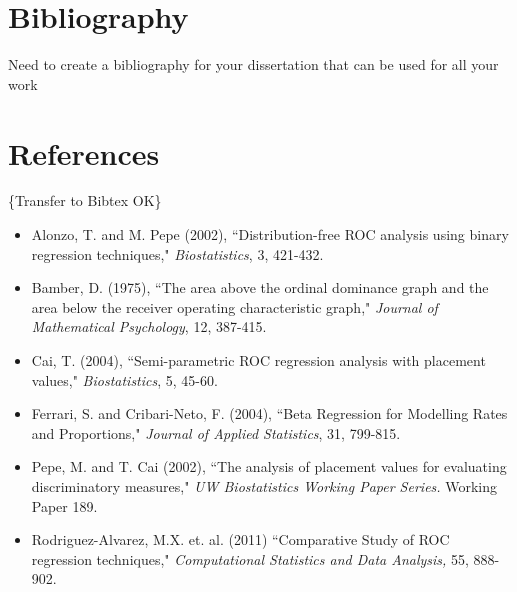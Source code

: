 \documentclass{interact}
\theoremstyle{definition}
\begin{document}





{\color{blue}\section{Bibliography}Need to create a bibliography for your dissertation that can be used  for all your work} 
\section{References}
{\color{red}\{Transfer to Bibtex  OK\}}
\begin{itemize}
\item Alonzo, T. and M. Pepe (2002), ``Distribution-free ROC analysis using binary regression techniques," \textit{Biostatistics}, 3,  421-432.
\item  Bamber, D. (1975), ``The area above the ordinal
dominance graph and the area below the receiver
operating characteristic graph," \textit{Journal of Mathematical
Psychology}, 12, 387-415.
\item Cai, T. (2004), ``Semi-parametric ROC regression analysis with placement values," \textit{Biostatistics}, 5, 45-60.
\item Ferrari, S. and Cribari-Neto, F. (2004), ``Beta Regression for Modelling Rates and Proportions," \textit{Journal of Applied Statistics}, 31, 799-815.
\item Pepe, M. and T. Cai (2002), ``The analysis of placement values for evaluating discriminatory measures," \textit{UW Biostatistics Working Paper Series.} Working Paper 189. 
\item Rodriguez-Alvarez, M.X. et. al. (2011) ``Comparative Study of ROC regression techniques," \textit{Computational Statistics and Data Analysis,} 55, 888-902.
\end{itemize}

%

%
\end{document}
